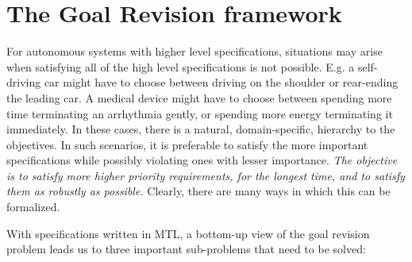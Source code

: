 \section{The Goal Revision framework}

For autonomous systems with higher level specifications, situations may arise when satisfying all of the high level specifications is not possible.
E.g. a self-driving car might have to choose between driving on the shoulder or rear-ending the leading car.
A medical device might have to choose between spending more time terminating an arrhythmia gently, or spending more energy terminating it immediately.
In these cases, there is a natural, domain-specific, hierarchy to the objectives.
In such scenarios, it is preferable to satisfy the more important specifications while possibly violating ones with lesser importance.
\textit{The objective is to satisfy more higher priority requirements, for the longest time, and to satisfy them as robustly as possible.}
Clearly, there are many ways in which this can be formalized.

With specifications written in MTL, a bottom-up view of the goal revision problem leads us to three important sub-problems that need to be solved:

